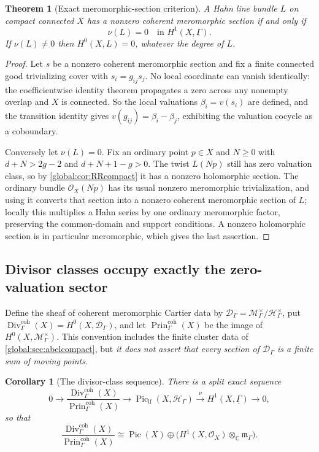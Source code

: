 \documentclass[11pt,letterpaper]{article}
\newtheorem{theorem}{Theorem}[section]
\newtheorem{corollary}[corollary]{Corollary}
\theoremstyle{definition}
\theoremstyle{remark}
\newcommand{\C}{\mathbb C}
\newcommand{\OO}{\mathcal O}
\newcommand{\HH}{\mathscr H_\Gamma}
\newcommand{\mK}{\mathfrak m_\Gamma}
\newcommand{\Pic}{\operatorname{Pic}}
\newcommand{\Piclf}{\operatorname{Pic}_{\mathrm{lf}}}
\newcommand{\MG}{\mathscr M_\Gamma}
\newcommand{\DG}{\mathscr D_\Gamma}
\newcommand{\Div}{\operatorname{Div}}
\newcommand{\Prin}{\operatorname{Prin}}
\numberwithin{equation}{section}
\begin{document}
\begin{theorem}[Exact meromorphic-section criterion]\label{global:thm:meromorphic}
A Hahn line bundle $L$ on compact connected $X$ has a nonzero coherent meromorphic section if and only if
\begin{equation}\label{global:eq:meromorphiccriterion}
  \nu(L)=0\quad\text{in }H^1(X,\underline\Gamma).
\end{equation}
If $\nu(L)\ne0$ then $H^0(X,L)=0$, whatever the degree of $L$.
\end{theorem}

\begin{proof}
Let $s$ be a nonzero coherent meromorphic section and fix a finite connected good trivializing cover with $s_i=g_{ij}s_j$. No local coordinate can vanish identically: the coefficientwise identity theorem propagates a zero across any nonempty overlap and $X$ is connected. So the local valuations $\beta_i=v(s_i)$ are defined, and the transition identity gives $v(g_{ij})=\beta_i-\beta_j$, exhibiting the valuation cocycle as a coboundary.

Conversely let $\nu(L)=0$. Fix an ordinary point $p\in X$ and $N\ge0$ with $d+N>2g-2$ and $d+N+1-g>0$. The twist $L(Np)$ still has zero valuation class, so by \cref{global:cor:RRcompact} it has a nonzero holomorphic section. The ordinary bundle $\OO_X(Np)$ has its usual nonzero meromorphic trivialization, and using it converts that section into a nonzero coherent meromorphic section of $L$; locally this multiplies a Hahn series by one ordinary meromorphic factor, preserving the common-domain and support conditions. A nonzero holomorphic section is in particular meromorphic, which gives the last assertion.
\end{proof}

\subsection{Divisor classes occupy exactly the zero-valuation sector}

Define the sheaf of coherent meromorphic Cartier data by $\DG=\MG^\times/\HH^\times$, put $\Div^{\mathrm{coh}}_\Gamma(X)=H^0(X,\DG)$, and let $\Prin^{\mathrm{coh}}_\Gamma(X)$ be the image of $H^0(X,\MG^\times)$. This convention includes the finite cluster data of \cref{global:sec:abelcompact}, but \emph{it does not assert that every section of $\DG$ is a finite sum of moving points}.

\begin{corollary}[The divisor-class sequence]\label{global:cor:divseq}
There is a split exact sequence
\begin{equation}\label{global:eq:divseq}
  0\longrightarrow
  \frac{\Div^{\mathrm{coh}}_\Gamma(X)}{\Prin^{\mathrm{coh}}_\Gamma(X)}
  \longrightarrow\Piclf(X,\HH)
  \xrightarrow{\ \nu\ }H^1(X,\underline\Gamma)\longrightarrow0,
\end{equation}
so that
\begin{equation}\label{global:eq:divclass}
  \frac{\Div^{\mathrm{coh}}_\Gamma(X)}{\Prin^{\mathrm{coh}}_\Gamma(X)}
  \cong\Pic(X)\oplus\bigl(H^1(X,\OO_X)\otimes_\C\mK\bigr).
\end{equation}
\end{corollary}
\end{document}
